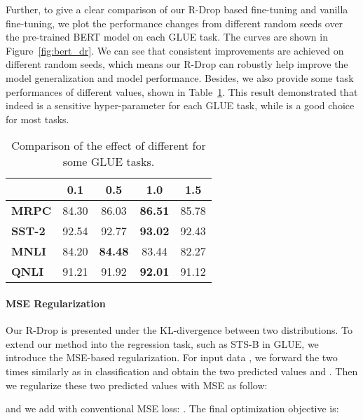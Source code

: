 \documentclass{article}
\begin{document}
Further, to give a clear comparison of our R-Drop based fine-tuning and vanilla fine-tuning, we plot the performance changes from different random seeds over the pre-trained BERT model on each GLUE task. The curves are shown in Figure~\ref{fig:bert_dr}. We can see that consistent improvements are achieved on different random seeds, which means our R-Drop can robustly help improve the model generalization and model performance.
Besides, we also provide some task performances of different  values, shown in Table~\ref{tab:diff_alpha}.
This result demonstrated that  indeed is a sensitive hyper-parameter for each GLUE task, while  is a good choice for most tasks.

\begin{table}
	\centering
	\begin{tabular}{l c c c c}
		\toprule
		\textbf{} & \textbf{0.1} & \textbf{0.5} & \textbf{1.0} & \textbf{1.5} \\
		\midrule
		\textbf{MRPC} & 84.30 & 86.03 & \textbf{86.51} & 85.78 \\
		\textbf{SST-2} & 92.54 & 92.77 & \textbf{93.02} & 92.43 \\
		\textbf{MNLI} & 84.20 & \textbf{84.48} & 83.44 & 82.27 \\
		\textbf{QNLI} & 91.21 & 91.92 & \textbf{92.01} & 91.12 \\
		\bottomrule
	\end{tabular}
	\caption{
		Comparison of the effect of different  for some GLUE tasks.
	}
	\label{tab:diff_alpha}
\end{table}

\paragraph{MSE Regularization}
Our R-Drop is presented under the KL-divergence between two distributions. To extend our method into the regression task, such as STS-B in GLUE, we introduce the MSE-based regularization. For input data , we forward the  two times similarly as in classification and obtain the two predicted values  and . Then we regularize these two predicted values with MSE as follow:

and we add  with conventional MSE loss: . The final optimization objective is:
\end{document}
